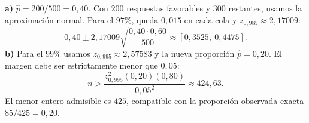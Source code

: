\textbf{a)} $\hat p=200/500=0{,}40$. Con $200$ respuestas favorables y $300$ restantes, usamos la aproximación normal. Para el $97\%$, queda $0{,}015$ en cada cola y $z_{0{,}985}\approx2{,}17009$:
\[
0{,}40\pm2{,}17009\sqrt{\frac{0{,}40\cdot0{,}60}{500}}
\approx\boxed{[0{,}3525,\ 0{,}4475]}.
\]
\textbf{b)} Para el $99\%$ usamos $z_{0{,}995}\approx2{,}57583$ y la nueva proporción $\hat p=0{,}20$. El margen debe ser estrictamente menor que $0{,}05$:
\[
n>\frac{z_{0{,}995}^2(0{,}20)(0{,}80)}{0{,}05^2}\approx424{,}63.
\]
El menor entero admisible es $\boxed{425}$, compatible con la proporción observada exacta $85/425=0{,}20$.
